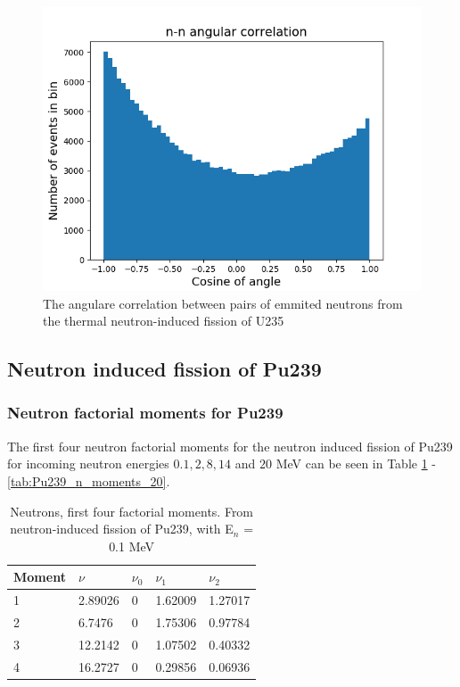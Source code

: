 \documentclass[]{article}
\begin{document}
\begin{figure} [H]
	\centering
	\includegraphics[scale=0.65]{U235_n_n_ang_corr.png}
	\caption{The angulare correlation between pairs of emmited neutrons from the thermal neutron-induced fission of U235}
	\label{fig:U235_n_n_ang_corr}
\end{figure}


\subsection{Neutron induced fission of Pu239}

\subsubsection{Neutron factorial moments for Pu239}

The first four neutron factorial moments for the neutron induced fission of Pu239 for incoming neutron energies $0.1, 2, 8, 14$ and $20$ MeV can be seen in Table \ref{tab:Pu239_n_moments_0_1} - \ref{tab:Pu239_n_moments_20}.

\begin{table} [H]
	\centering
	\caption{Neutrons, first four factorial moments. From neutron-induced fission of Pu239, with E$_n$ = 0.1 MeV }
	\begin{tabularx}{\textwidth}{XXXXX} \hline
		\label{tab:Pu239_n_moments_0_1}
		Moment & $\nu$ & $\nu_0$ & $\nu_1$ & $\nu_2$ \\ \hline
		1 & 2.89026 & 0 &1.62009 & 1.27017\\
		2 & 6.7476 & 0 & 1.75306 & 0.97784\\
		3 & 12.2142 & 0 & 1.07502 & 0.40332\\
		4 & 16.2727 & 0 & 0.29856 & 0.06936\\ 
	\end{tabularx}
\end{table}
\end{document}

